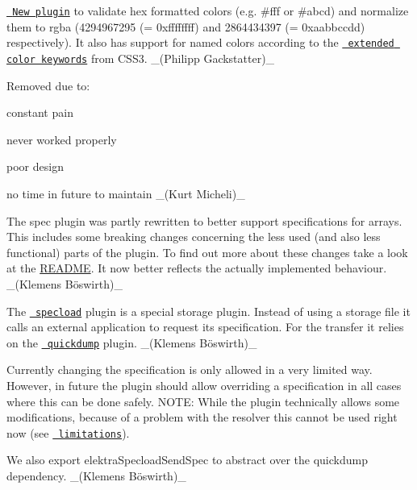 \begin{DoxyItemize}
\item \href{https://www.libelektra.org/plugins/rgbcolor}{\texttt{ New plugin}} to validate hex formatted colors (e.\+g. \#fff or \#abcd) and normalize them to rgba (4294967295 (= 0xffffffff) and 2864434397 (= 0xaabbccdd) respectively). It also has support for named colors according to the \href{https://www.w3.org/TR/css-color-3/\#svg-color}{\texttt{ extended color keywords}} from C\+S\+S3. \+\_\+(\+Philipp Gackstatter)\+\_\+
\end{DoxyItemize}

Removed due to\+:


\begin{DoxyItemize}
\item constant pain
\item never worked properly
\item poor design
\item no time in future to maintain \+\_\+(\+Kurt Micheli)\+\_\+
\end{DoxyItemize}


\begin{DoxyItemize}
\item The spec plugin was partly rewritten to better support specifications for arrays. This includes some breaking changes concerning the less used (and also less functional) parts of the plugin. To find out more about these changes take a look at the \mbox{\hyperlink{autotoc_md644_src_plugins_spec_README_md}{R\+E\+A\+D\+ME}}. It now better reflects the actually implemented behaviour. \+\_\+(Klemens Böswirth)\+\_\+
\end{DoxyItemize}


\begin{DoxyItemize}
\item The \href{https://www.libelektra.org/plugins/specload}{\texttt{ specload}} plugin is a special storage plugin. Instead of using a storage file it calls an external application to request its specification. For the transfer it relies on the \href{https://www.libelektra.org/plugins/quickdump}{\texttt{ quickdump}} plugin. \+\_\+(Klemens Böswirth)\+\_\+
\item Currently changing the specification is only allowed in a very limited way. However, in future the plugin should allow overriding a specification in all cases where this can be done safely. N\+O\+TE\+: While the plugin technically allows some modifications, because of a problem with the resolver this cannot be used right now (see \href{https://www.libelektra.org/plugins/specload}{\texttt{ limitations}}).
\item We also export {\ttfamily elektra\+Specload\+Send\+Spec} to abstract over the {\ttfamily quickdump} dependency. \+\_\+(Klemens Böswirth)\+\_\+
\end{DoxyItemize}


